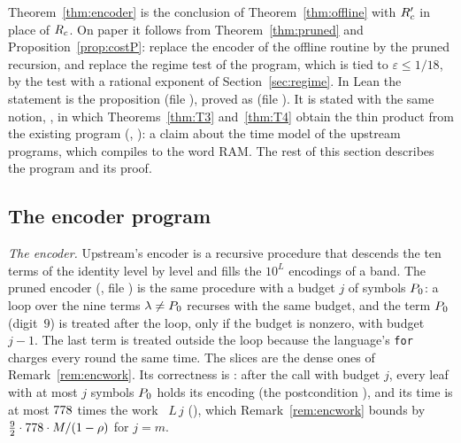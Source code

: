 Theorem~\ref{thm:encoder} is the conclusion of Theorem~\ref{thm:offline} with
\(R'_{c}\) in place of \(R_{c}\).  On paper it follows from
Theorem~\ref{thm:pruned} and Proposition~\ref{prop:costP}: replace the encoder
of the offline routine by the pruned recursion, and replace the regime test of
the program, which is tied to \(\varepsilon\le1/18\), by the test with a
rational exponent of Section~\ref{sec:regime}.  In Lean the statement is the
proposition  (file ),
proved as  (file ).
It is stated with the same notion, , in which
Theorems~\ref{thm:T3} and~\ref{thm:T4} obtain the thin product from the
existing program (, ): a claim
about the time model
 of the upstream programs, which \cite{upstream} compiles to
the word RAM.  The rest of this section describes the program and its proof.

\subsection{The encoder program}
\label{sec:encoder-program}

\emph{The encoder.}  Upstream's encoder is a recursive procedure
 that descends the ten terms of the identity level by level and
fills the \(10^{L}\) encodings of a band.  The pruned encoder
(, file ) is the
same procedure with a budget \(j\) of symbols \(P_{0}\): a loop over the nine
terms \(\lambda\ne P_{0}\) recurses with the same budget, and the term \(P_{0}\)
(digit~\(9\)) is treated after the loop, only if the budget is nonzero, with
budget \(j-1\).  The last term is treated outside the loop because the
language's \texttt{for} charges every round the same time.  The slices are the
dense ones of Remark~\ref{rem:encwork}.  Its correctness is :
after the call with budget \(j\), every leaf with at most \(j\) symbols \(P_{0}\)
holds its encoding (the postcondition ), and its time is at
most \(778\) times the work ~\(L\,j\) (),
which Remark~\ref{rem:encwork} bounds by
\(\frac92\cdot778\cdot M/(1-\rho)\) for \(j=m\).

